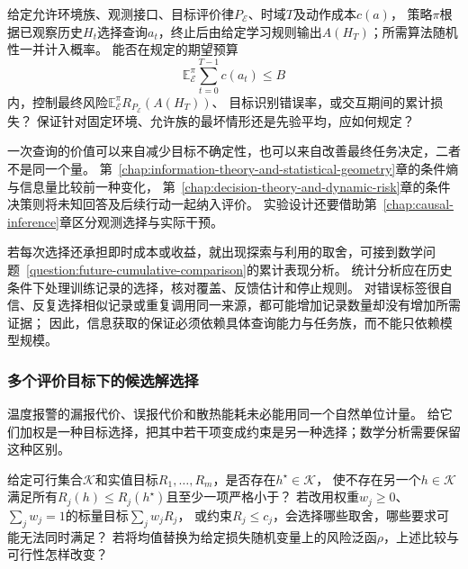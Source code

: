 \begin{mathproblem}[观测选择策略的信息收益与代价]
  \label{question:future-information-acquisition}
  给定允许环境族、观测接口、目标评价律$P_{\mathcal E}$、时域$T$及动作成本$c(a)$，
  策略$\pi$根据已观察历史$H_t$选择查询$a_t$，终止后由给定学习规则输出$A(H_T)$；所需算法随机性一并计入概率。
  能否在规定的期望预算
  \[
    \mathbb E_{\mathcal E}^{\pi}\sum_{t=0}^{T-1}c(a_t)\leq B
  \]
  内，控制最终风险$\mathbb E_{\mathcal E}^{\pi}R_{P_{\mathcal E}}(A(H_T))$、
  目标识别错误率，或交互期间的累计损失？
  保证针对固定环境、允许族的最坏情形还是先验平均，应如何规定？
\end{mathproblem}

一次查询的价值可以来自减少目标不确定性，也可以来自改善最终任务决定，二者不是同一个量。
第~\ref{chap:information-theory-and-statistical-geometry}章的条件熵与信息量比较前一种变化，
第~\ref{chap:decision-theory-and-dynamic-risk}章的条件决策则将未知回答及后续行动一起纳入评价。
实验设计还要借助第~\ref{chap:causal-inference}章区分观测选择与实际干预。

若每次选择还承担即时成本或收益，就出现探索与利用的取舍，可接到数学问题~\ref{question:future-cumulative-comparison}的累计表现分析。
统计分析应在历史条件下处理训练记录的选择，核对覆盖、反馈估计和停止规则。
对错误标签很自信、反复选择相似记录或重复调用同一来源，都可能增加记录数量却没有增加所需证据；
因此，信息获取的保证必须依赖具体查询能力与任务族，而不能只依赖模型规模。

\subsubsection{多个评价目标下的候选解选择}
\label{sec:future-analysis-multiple-objectives}

温度报警的漏报代价、误报代价和散热能耗未必能用同一个自然单位计量。
给它们加权是一种目标选择，把其中若干项变成约束是另一种选择；数学分析需要保留这种区别。

\begin{mathproblem}
  \label{question:future-multiple-objectives}
  给定可行集合$\mathcal K$和实值目标$R_1,\ldots,R_m$，是否存在$h^\star\in\mathcal K$，
  使不存在另一个$h\in\mathcal K$满足所有$R_j(h)\leq R_j(h^\star)$且至少一项严格小于？
  若改用权重$w_j\geq0$、$\sum_jw_j=1$的标量目标$\sum_jw_jR_j$，
  或约束$R_j\leq c_j$，会选择哪些取舍，哪些要求可能无法同时满足？
  若将均值替换为给定损失随机变量上的风险泛函$\rho$，上述比较与可行性怎样改变？
\end{mathproblem}

